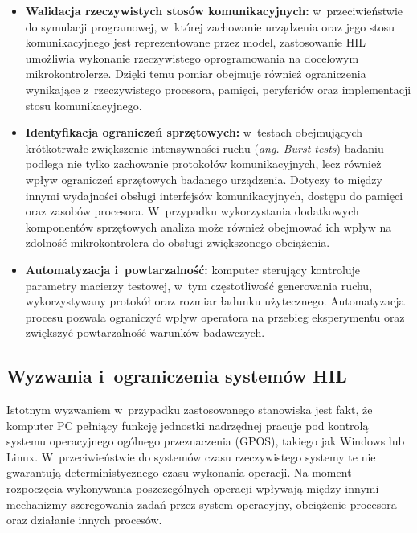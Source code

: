 \begin{itemize}

    \item \textbf{Walidacja rzeczywistych stosów komunikacyjnych:}
          w~przeciwieństwie do symulacji programowej, w~której zachowanie urządzenia oraz jego stosu komunikacyjnego jest reprezentowane przez model, zastosowanie HIL umożliwia wykonanie rzeczywistego oprogramowania na docelowym mikrokontrolerze.
          Dzięki temu pomiar obejmuje również ograniczenia wynikające z~rzeczywistego procesora, pamięci, peryferiów oraz implementacji stosu komunikacyjnego.

    \item \textbf{Identyfikacja ograniczeń sprzętowych:}
          w~testach obejmujących krótkotrwałe zwiększenie intensywności ruchu (\textit{ang. Burst tests}) badaniu podlega nie tylko zachowanie protokołów komunikacyjnych, lecz również wpływ ograniczeń sprzętowych badanego urządzenia.
          Dotyczy to między innymi wydajności obsługi interfejsów komunikacyjnych, dostępu do pamięci oraz zasobów procesora.
          W~przypadku wykorzystania dodatkowych komponentów sprzętowych analiza może również obejmować ich wpływ na zdolność mikrokontrolera do obsługi zwiększonego obciążenia.

    \item \textbf{Automatyzacja i~powtarzalność:}
          komputer sterujący kontroluje parametry macierzy testowej, w~tym częstotliwość generowania ruchu, wykorzystywany protokół oraz rozmiar ładunku użytecznego.
          Automatyzacja procesu pozwala ograniczyć wpływ operatora na przebieg eksperymentu oraz zwiększyć powtarzalność warunków badawczych.

\end{itemize}

\subsection{Wyzwania i~ograniczenia systemów HIL}

Istotnym wyzwaniem w~przypadku zastosowanego stanowiska jest fakt, że komputer PC pełniący funkcję jednostki nadrzędnej pracuje pod kontrolą systemu operacyjnego ogólnego przeznaczenia (GPOS), takiego jak Windows lub Linux.
W~przeciwieństwie do systemów czasu rzeczywistego systemy te nie gwarantują deterministycznego czasu wykonania operacji.
Na moment rozpoczęcia wykonywania poszczególnych operacji wpływają między innymi mechanizmy szeregowania zadań przez system operacyjny, obciążenie procesora oraz działanie innych procesów.

